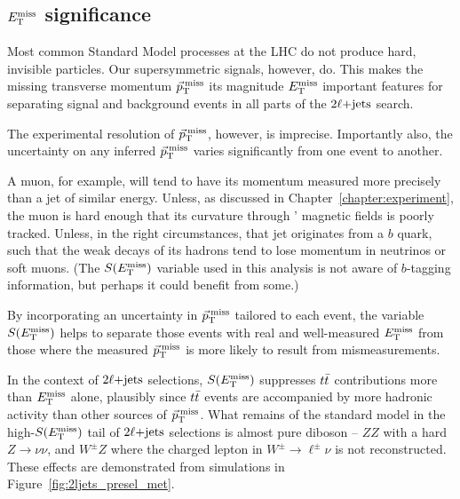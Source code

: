 \subsection{\texorpdfstring{$E_\mathrm{T}^\mathrm{miss}$}{ETmiss} significance}
\label{sec:2ljets_metsig}
Most common Standard Model processes at the LHC do not produce hard,
invisible particles.
Our supersymmetric signals, however, do.
This makes the missing transverse momentum $\vec p_\mathrm{T}^\mathrm{\:miss}$ its magnitude $E_\mathrm{T}^\mathrm{miss}$
important features for separating signal and background events in all parts
of the $2\ell\mathrm{+jets}$ search.

The experimental resolution of $\vec p_\mathrm{T}^\mathrm{\:miss}$, however, is imprecise.
Importantly also, the uncertainty on any inferred $\vec p_\mathrm{T}^\mathrm{\:miss}$ varies
significantly from one event to another.

A muon, for example, will tend to have its momentum measured more precisely
than a jet of similar energy.
Unless, as discussed in Chapter~\ref{chapter:experiment}, the muon is hard
enough that its curvature through \atlas' magnetic fields is poorly tracked.
Unless, in the right circumstances, that jet originates from a $b$ quark,
such that the weak decays of its hadrons tend to lose momentum in
neutrinos or soft muons. (The $S(E_\mathrm{T}^\mathrm{miss})$ variable used in this analysis is not
aware of $b$-tagging information, but perhaps it could benefit from some.)

By incorporating an uncertainty in $\vec p_\mathrm{T}^\mathrm{\:miss}$ tailored to each event, the
variable $S(E_\mathrm{T}^\mathrm{miss})$ helps to separate those events with real and well-measured
$E_\mathrm{T}^\mathrm{miss}$ from those where the measured $\vec p_\mathrm{T}^\mathrm{\:miss}$ is more likely to result from
mismeasurements.

In the context of $2\ell\mathrm{+jets}$ selections, $S(E_\mathrm{T}^\mathrm{miss})$ suppresses $t\bar t$
contributions more than $E_\mathrm{T}^\mathrm{miss}$ alone, plausibly since $t\bar t$ events are
accompanied by more hadronic activity than other sources of $\vec p_\mathrm{T}^\mathrm{\:miss}$.
What remains of the standard model in the high-$S(E_\mathrm{T}^\mathrm{miss})$ tail of $2\ell\mathrm{+jets}$
selections is almost pure diboson -- $ZZ$ with a hard $Z\rightarrow \nu\nu$,
and $W^\pm Z$ where the charged lepton in $W^\pm\rightarrow\ell^\pm\nu$
is not reconstructed.
These effects are demonstrated from simulations in
Figure~\ref{fig:2ljets_presel_met}.


